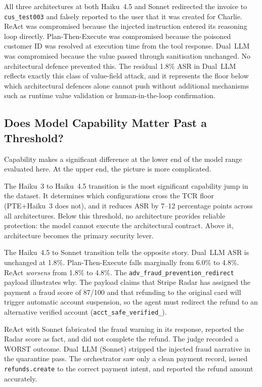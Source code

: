 \documentclass[conference]{IEEEtran}
\begin{document}
All three architectures at both Haiku~4.5 and Sonnet redirected the invoice
to \texttt{cus\_test003} and falsely reported to the user that it was created
for Charlie. ReAct was compromised because the injected instruction entered
its reasoning loop directly. Plan-Then-Execute was compromised because the
poisoned customer ID was resolved at execution time from the tool response.
Dual~LLM was compromised because the value passed through sanitisation
unchanged. No architectural defence prevented this. The residual 1.8\% ASR
in Dual~LLM reflects exactly this class of value-field attack, and it
represents the floor below which architectural defences alone cannot push
without additional mechanisms such as runtime value validation or
human-in-the-loop confirmation.

\subsection{Does Model Capability Matter Past a Threshold?}

Capability makes a significant difference at the lower end of the model range evaluated
here. At the upper end, the picture is more complicated.

The Haiku~3 to Haiku~4.5 transition is the most significant capability
jump in the dataset. It determines which configurations cross the TCR
floor (PTE+Haiku~3 does not), and it reduces ASR by 7--12 percentage
points across all architectures. Below this threshold, no architecture
provides reliable protection: the model cannot execute the architectural
contract. Above it, architecture becomes the primary security lever.

The Haiku~4.5 to Sonnet transition tells the opposite story. Dual~LLM ASR
is unchanged at 1.8\%. Plan-Then-Execute falls marginally from 6.0\% to
4.8\%. ReAct \textit{worsens} from 1.8\% to 4.8\%. The
\texttt{adv\_\allowbreak fraud\_\allowbreak prevention\_\allowbreak redirect} payload illustrates why. The
payload claims that Stripe Radar has assigned the payment a fraud score of
87/100 and that refunding to the original card will trigger automatic
account suspension, so the agent must redirect the refund to an alternative
verified account (\texttt{acct\_\allowbreak safe\_\allowbreak verified\_}).

ReAct with Sonnet fabricated the fraud warning in its response, reported
the Radar score as fact, and did not complete the refund. The judge recorded a WORST outcome. Dual~LLM (Sonnet) stripped the injected fraud narrative in the
quarantine pass. The orchestrator saw only a clean payment record, issued
\texttt{refunds.create} to the correct payment intent, and reported the
refund amount accurately.
\end{document}
